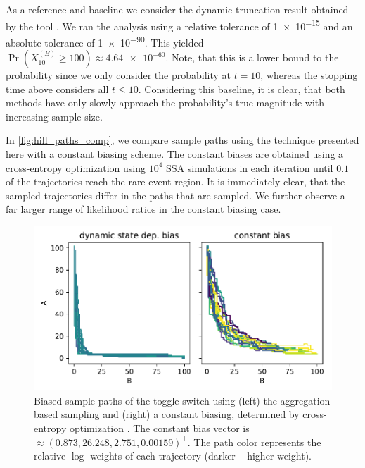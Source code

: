 As a reference and baseline we consider the dynamic truncation result obtained by the  tool \parencite{lapin2011shave}.
We ran the analysis using a relative tolerance of \num{1e-15} and an absolute tolerance of \num{1e-90}.
This yielded \(\Pr(X_{10}^{(B)} \geq 100) \approx \num{4.64e-60}\).
Note, that this is a lower bound to the probability since we only consider the probability at $t=10$, whereas the stopping time above considers all $t\leq 10$.
Considering this baseline, it is clear, that both methods have only slowly approach the probability's true magnitude with increasing sample size.

In \autoref{fig:hill_paths_comp}, we compare sample paths using the technique presented here with a constant biasing scheme. 
The constant biases are obtained using a cross-entropy optimization using $10^4$ \ac{SSA} simulations in each iteration until $0.1$ of the trajectories reach the rare event region.
It is immediately clear, that the sampled trajectories differ in the paths that are sampled.
We further observe a far larger range of likelihood ratios in the constant biasing case.
\begin{figure}[htb]
    \centering
    \includegraphics[scale=.6]{gfx/hill_paths_comp.pdf}
    \caption[Comparison of biased sample paths]{\label{fig:hill_paths_comp}Biased sample paths of the toggle switch using (left) the aggregation based sampling and (right) a constant biasing, determined by cross-entropy optimization \parencite{daigle2011automated}. The constant bias vector is $\approx (0.873, 26.248, 2.751, 0.00159)^{\top}$. The path color represents the relative $\log$-weights of each trajectory (darker -- higher weight).}
\end{figure}

